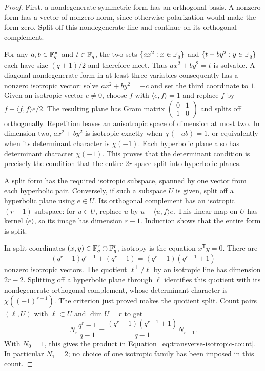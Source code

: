 \begin{proof}
First, a nondegenerate symmetric form has an orthogonal basis. A
nonzero form has a vector of nonzero norm, since otherwise polarization
would make the form zero. Split off this nondegenerate line and continue
on its orthogonal complement.

For any $a,b\in\mathbb F_q^\times$ and $t\in\mathbb F_q$, the two sets
$\{ax^2:x\in\mathbb F_q\}$ and $\{t-by^2:y\in\mathbb F_q\}$ each have size
$(q+1)/2$ and therefore meet. Thus $ax^2+by^2=t$ is solvable. A diagonal
nondegenerate form in at least three variables consequently has a
nonzero isotropic vector: solve $ax^2+by^2=-c$ and set the third
coordinate to $1$. Given an isotropic vector $e\ne0$, choose $f$ with
$\langle e,f\rangle=1$ and replace $f$ by
$f-\langle f,f\rangle e/2$. The resulting plane has Gram matrix
$\left(\begin{smallmatrix}0&1\\1&0\end{smallmatrix}\right)$ and splits
off orthogonally. Repetition leaves an anisotropic space of dimension
at most two. In dimension two, $ax^2+by^2$ is isotropic exactly when
$\chi(-ab)=1$, or equivalently when its determinant character is
$\chi(-1)$. Each hyperbolic plane also has determinant character
$\chi(-1)$. This proves that the determinant condition is precisely
the condition that the entire $2r$-space split into hyperbolic planes.

A split form has the required isotropic subspace, spanned by one vector
from each hyperbolic pair. Conversely, if such a subspace $U$ is given,
split off a hyperbolic plane using $e\in U$. Its orthogonal complement
has an isotropic $(r-1)$-subspace: for $u\in U$, replace $u$ by
$u-\langle u,f\rangle e$. This linear map on $U$ has kernel
$\langle e\rangle$, so its image has dimension $r-1$.
Induction shows that the entire form is split.

In split coordinates $(x,y)\in\mathbb F_q^r\oplus\mathbb F_q^r$, isotropy is the
equation $x^{\mathsf T}y=0$. There are
\[
 (q^r-1)q^{r-1}+(q^r-1)
 =(q^r-1)(q^{r-1}+1)
\]
nonzero isotropic vectors. The quotient $\ell^\perp/\ell$ by an
isotropic line has dimension $2r-2$. Splitting off a hyperbolic plane
through $\ell$ identifies this quotient with its nondegenerate
orthogonal complement, whose determinant character is
$\chi((-1)^{r-1})$. The criterion just proved makes the quotient split.
Count pairs $(\ell,U)$ with
$\ell\subset U$ and $\dim U=r$ to get
\[
 N_r\frac{q^r-1}{q-1}
 =\frac{(q^r-1)(q^{r-1}+1)}{q-1}N_{r-1}.
\]
With $N_0=1$, this gives the product in
Equation~\eqref{eq:transverse-isotropic-count}. In particular $N_1=2$;
no choice of one isotropic family has been imposed in this count.
\end{proof}

